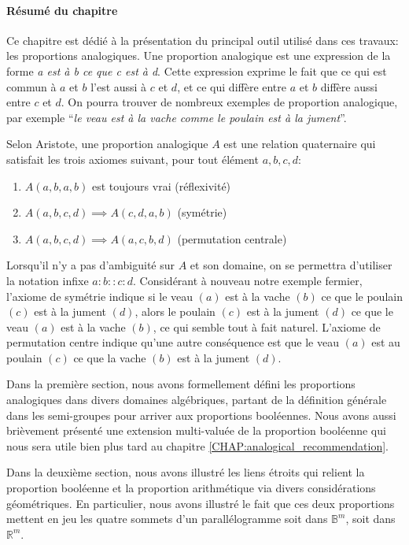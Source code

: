 \paragraph{Résumé du chapitre}
Ce chapitre est dédié à la présentation du principal outil utilisé dans ces
travaux: les proportions analogiques. Une proportion analogique est une
expression de la forme \textit{a est à b ce que c est à d}. Cette expression
exprime le fait que ce qui est commun à $a$ et $b$ l'est aussi à $c$ et $d$, et
ce qui diffère entre $a$ et $b$ diffère aussi entre $c$ et $d$. On pourra
trouver de nombreux exemples de proportion analogique, par exemple ``\textit{le
veau est à la vache comme le poulain est à la jument}''.

Selon Aristote, une proportion analogique $A$ est une relation quaternaire qui
satisfait les trois axiomes suivant, pour tout élément $a, b, c, d$:

\begin{enumerate}
\item $A(a,b,a,b)$ est toujours vrai (réflexivité)
\item $A(a,b,c,d) \implies A(c,d,a,b)$ (symétrie)
\item $A(a,b,c,d) \implies A(a,c,b,d)$ (permutation centrale)
\end{enumerate}

Lorsqu'il n'y a pas d'ambiguité sur $A$ et son domaine, on se permettra
d'utiliser la notation infixe $a:b::c:d$. Considérant à nouveau notre exemple
fermier, l'axiome de symétrie indique si le veau  $(a)$ est à la vache $(b)$
ce que le poulain $(c)$ est à la jument $(d)$, alors le poulain $(c)$ est  à la
jument $(d)$ ce que le veau $(a)$ est à la vache $(b)$, ce qui semble tout à
fait naturel. L'axiome de permutation centre indique qu'une autre conséquence
est que le veau $(a)$ est au poulain $(c)$ ce que la vache $(b)$ est à la
jument $(d)$.

Dans la première section, nous avons formellement défini les proportions
analogiques dans divers domaines algébriques, partant de la définition générale
dans les semi-groupes pour arriver aux proportions booléennes. Nous avons aussi
brièvement présenté une extension multi-valuée de la proportion booléenne qui
nous sera utile bien plus tard au chapitre
\ref{CHAP:analogical_recommendation}.

Dans la deuxième section, nous avons illustré les liens étroits qui relient la
proportion booléenne et la proportion arithmétique via divers considérations
géométriques. En particulier, nous avons illustré le fait que ces deux
proportions mettent en jeu les quatre sommets d'un parallélogramme soit dans
$\mathbb{B}^m$, soit dans $\mathbb{R}^m$.


